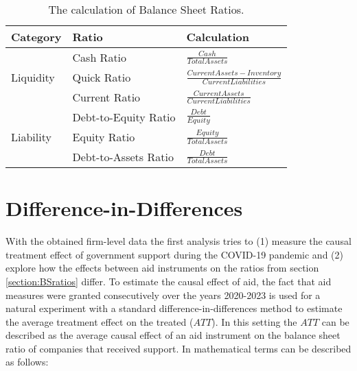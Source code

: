 \begin{table}%
    \caption{The calculation of Balance Sheet Ratios.}
    \label{tab:RatioCalc}
    \centering
    \def\arraystretch{1.5}
    \begin{tabular}{@{}lll@{}}
    \toprule
    Category                   & Ratio                & Calculation \\ \midrule
    \multirow{3}{*}{Liquidity} & Cash Ratio           & $\frac{Cash}{Total Assets}$ \\ %
                                & Quick Ratio          & $\frac{Current Assets-Inventory}{Current Liabilities}$ \\ %
                                & Current Ratio        & $\frac{Current Assets}{Current Liabilities}$ \\ \midrule
    \multirow{3}{*}{Liability} & Debt-to-Equity Ratio & $\frac{Debt}{Equity}$ \\ %
                                & Equity Ratio         & $\frac{Equity}{Total Assets}$ \\ %
                                & Debt-to-Assets Ratio & $\frac{Debt}{Total Assets}$ \\ \bottomrule
    \end{tabular}
\end{table}









\section{Difference-in-Differences}

With the obtained firm-level data the first analysis tries to (1) measure the causal treatment effect of government support during the COVID-19 pandemic and (2) explore how the effects between aid instruments on the ratios from section \ref{section:BSratios} differ. To estimate the causal effect of aid, the fact that aid measures were granted consecutively over the years 2020-2023 is used for a natural experiment with a standard difference-in-differences method to estimate the average treatment effect on the treated ($ATT$). In this setting the $ATT$ can be described as the average causal effect of an aid instrument on the balance sheet ratio of companies that received support. In mathematical terms can be described as follows:

